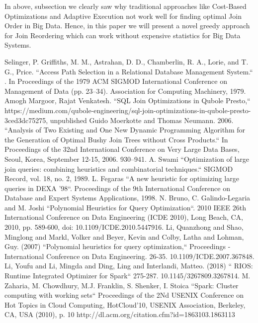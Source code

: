 \documentclass[conference]{IEEEtran}
\begin{document}



In above, subsection we clearly saw why traditional approaches like Cost-Based Optimizations and Adaptive Execution not work well for finding optimal Join Order in Big Data. Hence, in this paper we will present a novel greedy approach for Join Reordering which can work without expensive statistics for Big Data Systems.






\begin{thebibliography}{00}
 Selinger, P. Griffiths, M. M., Astrahan, D. D., Chamberlin, R. A., Lorie, and T. G., Price. ``Access Path Selection in a Relational Database Management System.`` . In Proceedings of the 1979 ACM SIGMOD International Conference on Management of Data (pp. 23–34). Association for Computing Machinery, 1979.
 Amogh Margoor, Rajat Venkatesh. ``SQL Join Optimizations in Qubole Presto,``
https://medium.com/qubole-engineering/sql-join-optimizations-in-qubole-presto-3ced3dc75275, unpublished
 Guido Moerkotte and Thomas Neumann. 2006. ``Analysis of Two Existing and One New Dynamic Programming Algorithm for the Generation of Optimal Bushy Join Trees without Cross Products.`` In Proceedings of the 32nd International Conference on Very Large Data Bases, Seoul, Korea, September 12-15, 2006. 930–941.
 A. Swami ``Optimization of large join queries: combining heuristics and
combinatorial techniques.`` SIGMOD Record, vol. 18, no. 2, 1989.
 L. Fegaras ``A new heuristic for optimizing large queries in DEXA ’98``. Proceedings of the 9th International Conference on Database and Expert Systems Applications, 1998.
 N. Bruno, C. Galindo-Legaria and M. Joshi ``Polynomial Heuristics for Query Optimization``. 2010 IEEE 26th International Conference on Data Engineering (ICDE 2010), Long Beach, CA, 2010, pp. 589-600, doi: 10.1109/ICDE.2010.5447916.
 Li, Quanzhong and Shao, Minglong and Markl, Volker and Beyer, Kevin and Colby, Latha and Lohman, Guy. (2007)  ``Polynomial heuristics for query optimization,`` Proceedings - International Conference on Data Engineering. 26-35. 10.1109/ICDE.2007.367848.
 Li, Youfu and Li, Mingda and Ding, Ling and Interlandi, Matteo. (2018)  `` RIOS: Runtime Integrated Optimizer for Spark`` 275-287. 10.1145/3267809.3267814.
 M. Zaharia, M. Chowdhury, M.J. Franklin, S. Shenker, I. Stoica
``Spark: Cluster computing with working sets`` Proceedings of the 2Nd USENIX Conference on Hot Topics in Cloud Computing, HotCloud’10, USENIX Association, Berkeley, CA, USA (2010), p. 10 http://dl.acm.org/citation.cfm?id=1863103.1863113

\end{thebibliography}
\end{document}
